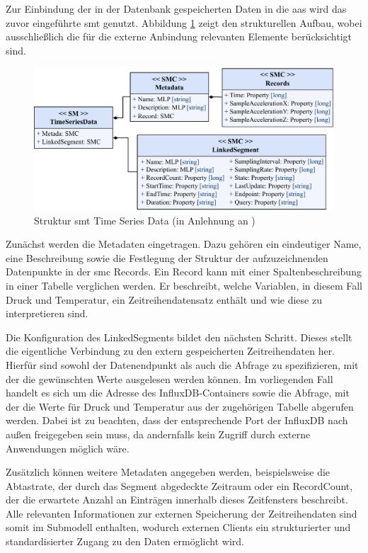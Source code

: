 Zur Einbindung der in der Datenbank gespeicherten Daten in die \acs{aas} wird das zuvor eingeführte \acs{smt} genutzt.
Abbildung \ref{fig:SMTTimeSeriesData} zeigt den strukturellen Aufbau, wobei ausschließlich die für die externe Anbindung relevanten Elemente berücksichtigt sind.

\begin{figure}[htbp]
    \centering
    \includegraphics[width=1\textwidth]{Bilder/TimeSeries/TimeSeriesData.pdf}
    \caption[Struktur \acs{smt} Time Series Data]{Struktur \acs{smt} Time Series Data (in Anlehnung an \cite{SpezifikationTimeSeriesData})}
    \label{fig:SMTTimeSeriesData}
\end{figure}

Zunächst werden die Metadaten eingetragen. 
Dazu gehören ein eindeutiger Name, eine Beschreibung sowie die Festlegung der Struktur der aufzuzeichnenden Datenpunkte in der \acs{smc} Records.
Ein Record kann mit einer Spaltenbeschreibung in einer Tabelle verglichen werden.
Er beschreibt, welche Variablen, in diesem Fall Druck und Temperatur, ein Zeitreihendatensatz enthält und wie diese zu interpretieren sind.

Die Konfiguration des LinkedSegments bildet den nächsten Schritt.
Dieses stellt die eigentliche Verbindung zu den extern gespeicherten Zeitreihendaten her. 
Hierfür sind sowohl der Datenendpunkt als auch die Abfrage zu spezifizieren, mit der die gewünschten Werte ausgelesen werden können. 
Im vorliegenden Fall handelt es sich um die Adresse des InfluxDB-Containers sowie die Abfrage, mit der die Werte für Druck und Temperatur aus der zugehörigen Tabelle abgerufen werden. 
Dabei ist zu beachten, dass der entsprechende Port der InfluxDB nach außen freigegeben sein muss, da andernfalls kein Zugriff durch externe Anwendungen möglich wäre.

Zusätzlich können weitere Metadaten angegeben werden, beispielsweise die Abtastrate, der durch das Segment abgedeckte Zeitraum oder ein RecordCount, der die erwartete Anzahl an Einträgen innerhalb dieses Zeitfensters beschreibt.
Alle relevanten Informationen zur externen Speicherung der Zeitreihendaten sind somit im Submodell enthalten, wodurch externen Clients ein strukturierter und standardisierter Zugang zu den Daten ermöglicht wird.

